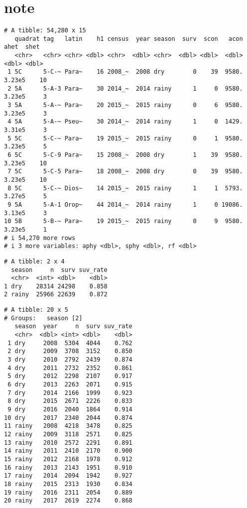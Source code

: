 \documentclass[
  12pt,
  letterpaper,
  DIV=11,
  numbers=noendperiod]{scrartcl}
\author{}
\date{}
\begin{document}
\hypertarget{note}{%
\section{note}\label{note}}

\begin{verbatim}
# A tibble: 54,280 x 15
   quadrat tag   latin    h1 census  year season  surv  scon   acon   ahet  shet
   <chr>   <chr> <chr> <dbl> <chr>  <dbl> <chr>  <dbl> <dbl>  <dbl>  <dbl> <dbl>
 1 5C      5-C-~ Para~    16 2008_~  2008 dry        0    39  9580. 3.23e5    10
 2 5A      5-A-3 Para~    30 2014_~  2014 rainy      1     0  9580. 3.23e5     3
 3 5A      5-A-~ Para~    20 2015_~  2015 rainy      0     6  9580. 3.23e5     3
 4 5A      5-A-~ Pseu~    30 2014_~  2014 rainy      1     0  1429. 3.31e5     3
 5 5C      5-C-~ Para~    19 2015_~  2015 rainy      0     1  9580. 3.23e5     5
 6 5C      5-C-9 Para~    15 2008_~  2008 dry        1    39  9580. 3.23e5    10
 7 5C      5-C-5 Para~    18 2008_~  2008 dry        0    39  9580. 3.23e5    10
 8 5C      5-C-~ Dios~    14 2015_~  2015 rainy      1     1  5793. 3.27e5     5
 9 5A      5-A-1 Orop~    44 2014_~  2014 rainy      1     0 19086. 3.13e5     3
10 5B      5-B-~ Para~    19 2015_~  2015 rainy      0     9  9580. 3.23e5     1
# i 54,270 more rows
# i 3 more variables: aphy <dbl>, sphy <dbl>, rf <dbl>
\end{verbatim}

\begin{verbatim}
# A tibble: 2 x 4
  season     n  surv suv_rate
  <chr>  <int> <dbl>    <dbl>
1 dry    28314 24298    0.858
2 rainy  25966 22639    0.872
\end{verbatim}

\begin{verbatim}
# A tibble: 20 x 5
# Groups:   season [2]
   season  year     n  surv suv_rate
   <chr>  <dbl> <int> <dbl>    <dbl>
 1 dry     2008  5304  4044    0.762
 2 dry     2009  3708  3152    0.850
 3 dry     2010  2792  2439    0.874
 4 dry     2011  2732  2352    0.861
 5 dry     2012  2298  2107    0.917
 6 dry     2013  2263  2071    0.915
 7 dry     2014  2166  1999    0.923
 8 dry     2015  2671  2226    0.833
 9 dry     2016  2040  1864    0.914
10 dry     2017  2340  2044    0.874
11 rainy   2008  4218  3478    0.825
12 rainy   2009  3118  2571    0.825
13 rainy   2010  2572  2291    0.891
14 rainy   2011  2410  2170    0.900
15 rainy   2012  2168  1978    0.912
16 rainy   2013  2143  1951    0.910
17 rainy   2014  2094  1942    0.927
18 rainy   2015  2313  1930    0.834
19 rainy   2016  2311  2054    0.889
20 rainy   2017  2619  2274    0.868
\end{verbatim}
\end{document}
